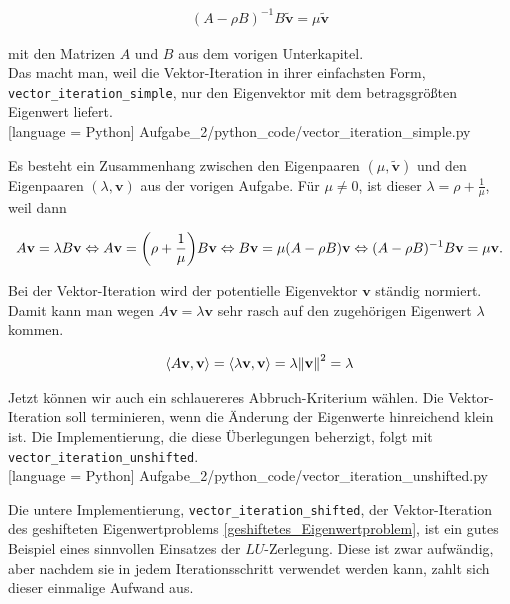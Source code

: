 \begin{align} \label{geshiftetes_Eigenwertproblem}
  (A - \rho B)^{-1} B \tilde{\mathbf{v}} = \mu \tilde{\mathbf{v}}
\end{align}

mit den Matrizen $A$ und $B$ aus dem vorigen Unterkapitel. \\

Das macht man, weil die Vektor-Iteration in ihrer einfachsten Form, \verb|vector_iteration_simple|, nur den Eigenvektor mit dem betragsgrößten Eigenwert liefert. \\


[language = Python]
{Aufgabe_2/python_code/vector_iteration_simple.py}
\vspace{10pt}

Es besteht ein Zusammenhang zwischen den Eigenpaaren $(\mu, \tilde{\mathbf{v}})$ und den Eigenpaaren $(\lambda, \mathbf{v})$ aus der vorigen Aufgabe. Für $\mu \neq 0$, ist dieser $\lambda = \rho + \frac{1}{\mu}$, weil dann

\begin{align*}
  A \mathbf{v} = \lambda B \mathbf{v}
  \Leftrightarrow
    A \mathbf{v} = {\left ( \rho + \frac{1}{\mu} \right )} B \mathbf{v}
  \Leftrightarrow
    B \mathbf{v} = \mu (A - \rho B) \mathbf{v}
  \Leftrightarrow
    (A - \rho B)^{-1} B \mathbf{v} = \mu \mathbf{v}.
\end{align*}

Bei der Vektor-Iteration wird der potentielle Eigenvektor $\mathbf{v}$ ständig normiert. Damit kann man wegen $A \mathbf{v} = \lambda \mathbf{v}$ sehr rasch auf den zugehörigen Eigenwert $\lambda$ kommen.

\begin{align*}
  {\left < A \mathbf{v}, \mathbf{v} \right >}
  = {\left < \lambda \mathbf{v}, \mathbf{v} \right >}
  = \lambda {\left \| \mathbf{v} \right \|}_{}^2
  = \lambda
\end{align*}

Jetzt können wir auch ein schlauereres Abbruch-Kriterium wählen. Die Vektor-Iteration soll terminieren, wenn die Änderung der Eigenwerte hinreichend klein ist. Die Implementierung, die diese Überlegungen beherzigt, folgt mit \verb|vector_iteration_unshifted|. \\


[language = Python]
{Aufgabe_2/python_code/vector_iteration_unshifted.py}
\vspace{10pt}

Die untere Implementierung, \verb|vector_iteration_shifted|, der Vektor-Iteration des geshifteten Eigenwertproblems \eqref{geshiftetes_Eigenwertproblem}, ist ein gutes Beispiel eines sinnvollen Einsatzes der $LU$-Zerlegung. Diese ist zwar aufwändig, aber nachdem sie in jedem Iterationsschritt verwendet werden kann, zahlt sich dieser einmalige Aufwand aus. \\

